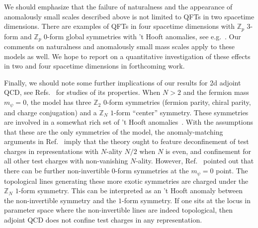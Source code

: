 \documentclass[11pt]{article}
\begin{document}
We should emphasize that the failure of naturalness and the appearance of anomalously small scales described above is not limited to QFTs in two spacetime dimensions.  
There are examples of QFTs in four spacetime dimensions with $\mathbb{Z}_p$ $3$-form and $\mathbb{Z}_p$ $0$-form global symmetries with 't Hooft anomalies, see e.g.~\cite{Tanizaki:2019rbk,Cherman:2020cvw}. Our comments on naturalness and anomalously small mass scales apply to these models as well.  We hope to report on a quantitative investigation of these effects in two and four spacetime dimensions in forthcoming work.

Finally, we should note some further implications of our results for 2d adjoint QCD, see Refs.~\cite{Witten:1978ka,Dalley:1992yy,Kutasov:1993gq,Bhanot:1993xp,Boorstein:1993nd,Lenz:1994du,
Kogan:1995nd,Zhitnitsky:1995qa,Smilga:1994hc,Gross:1995bp,Armoni:1995tf,Smilga:1996dn,
Paniak:1996zn,Pinsky:1996nu,McCartor:1996nj,Dalley:1997df,Frishman:1997uu,Armoni:1997ki,
Armoni:1998ny,Antonuccio:1998uz,Gross:1997mx,Fugleberg:1997ra,Armoni:1999xw,Armoni:2000uw,
Trittmann:2001dk,Abrashkin:2004in,Frishman:2010zz,Korcyl:2011kt,Katz:2013qua,Cohen:2015hwa,
Trittmann:2015oka,Trittmann:2018obm,Dubovsky:2018dlk,Donahue:2019adv,Cherman:2019hbq,Komargodski:2020mxz,Dempsey:2021xpf} for studies of its properties. When $N>2$ and the fermion mass $m_{\psi} = 0$, the model has three $\mathbb{Z}_2$ $0$-form symmetries (fermion parity, chiral parity, and charge conjugation) and a $\mathbb{Z}_N$ $1$-form ``center'' symmetry.  These symmetries are involved in a somewhat rich set of 't Hooft anomalies~\cite{Cherman:2019hbq}.  With the assumptions that these are the only symmetries of the model, the anomaly-matching arguments in Ref.~\cite{Cherman:2019hbq} imply that the theory ought to feature deconfinement of test charges in representations with $N$-ality $N/2$ when $N$ is even, and confinement for all other test charges with non-vanishing $N$-ality.   However, Ref.~\cite{Komargodski:2020mxz} pointed out that there can be further non-invertible $0$-form symmetries at the $m_{\psi} = 0$ point.  The topological lines generating these more exotic symmetries are charged under the $\mathbb{Z}_N$ $1$-form symmetry.  This can be interpreted as an 't Hooft anomaly between the non-invertible symmetry and the $1$-form symmetry.  If one sits at the locus in parameter space where the non-invertible lines are indeed topological, then adjoint QCD does not confine test charges in any representation. 
\end{document}
